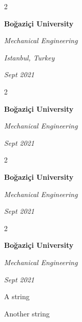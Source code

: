 \documentclass[10pt, letterpaper]{article}
\newenvironment{summary}{
    \begin{description}[
        topsep=0.10 cm,
        parsep=0.10 cm,
        partopsep=0pt,
        itemsep=0pt,
        leftmargin=0.4 cm + 10pt
    ]
}{
    \end{description}
} %
\newenvironment{twocolentry}[2][]{
    \onecolentry
    \def\secondColumn{#2}
    \setcolumnwidth{\fill, 4.5 cm}
    \begin{paracol}{2}
}{
    \switchcolumn \raggedleft \secondColumn
    \end{paracol}
    \endonecolentry
} %
\begin{document}
        \vspace{0.2 cm}

        \begin{twocolentry}{
        \textit{Istanbul, Turkey}    
            
        \textit{Sept 2021}}
            \textbf{Boğaziçi University}

            \textit{Mechanical Engineering}
        \end{twocolentry}


        \vspace{0.2 cm}

        \begin{twocolentry}{
            
            
        \textit{Sept 2021}}
            \textbf{Boğaziçi University}

            \textit{Mechanical Engineering}
        \end{twocolentry}


        \vspace{0.2 cm}

        \begin{twocolentry}{
            
            
        \textit{Sept 2021}}
            \textbf{Boğaziçi University}

            \textit{Mechanical Engineering}
        \end{twocolentry}


        \vspace{0.2 cm}

        \begin{twocolentry}{
            
            
        \textit{Sept 2021}}
            \textbf{Boğaziçi University}

            \textit{Mechanical Engineering}
        \end{twocolentry}
            \begin{summary}
                \item A string
                \item Another string
            \end{summary}


        \vspace{0.2 cm}
\end{document}

